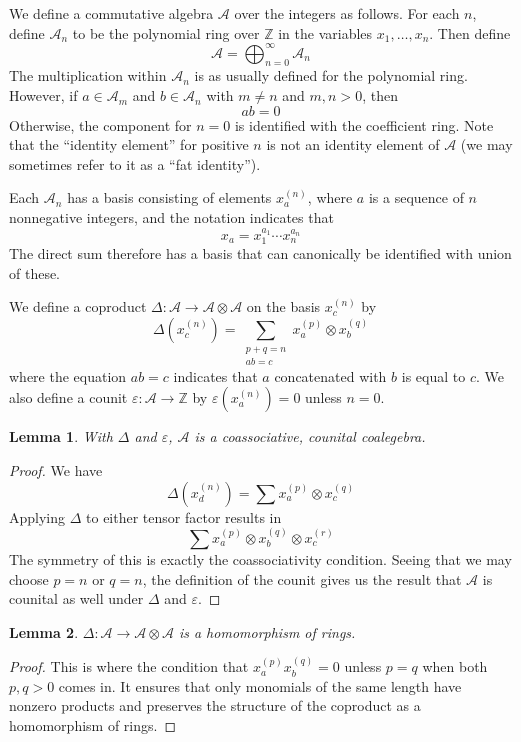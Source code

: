 \documentclass{amsart}
\newtheorem{lemma}{Lemma}[subsection]
\theoremstyle{definition}
\theoremstyle{remark}
\numberwithin{equation}{subsection}
\newcommand{\coma}{\mathcal{A}}
\begin{document}
We define a commutative algebra $\coma$ over the integers as follows. For each $n$, define $\coma_n$ to be the polynomial ring over $\mathbb{Z}$ in the variables $x_1,\ldots,x_n$. Then define
$$\coma =\bigoplus_{n=0}^\infty \coma_n$$
The multiplication within $\coma_n$ is as usually defined for the polynomial ring. However, if $a\in \coma_m$ and $b\in \coma_n$ with $m\neq n$ and $m,n>0$,  then
$$ab = 0$$
Otherwise, the component for $n=0$ is identified with the coefficient ring. Note that the ``identity element'' for positive $n$ is not an identity element of $\coma$ (we may sometimes refer to it as a ``fat identity'').

Each $\coma_n$ has a basis consisting of elements $x_a^{(n)}$, where $a$ is a sequence of $n$ nonnegative integers, and the notation indicates that
$$x_a = x_1^{a_1}\cdots x_n^{a_n}$$
The direct sum therefore has a basis that can canonically be identified with union of these.

We define a coproduct $\Delta:\coma\to\coma\otimes\coma$ on the basis $x_c^{(n)}$ by
$$\Delta(x_c^{(n)}) = \sum_{\substack{p+q=n\\ab=c}} x_a^{(p)}\otimes x_b^{(q)}$$
where the equation $ab=c$ indicates that $a$ concatenated with $b$ is equal to $c$. We also define a counit $\varepsilon:\coma\to \mathbb{Z}$ by $\varepsilon(x_a^{(n)})=0$ unless $n=0$.

\begin{lemma}
	With $\Delta$ and $\varepsilon$, $\coma$ is a coassociative, counital coalegebra.
\end{lemma}
\begin{proof}
	We have 
	$$\Delta(x_d^{(n)})=\sum x_a^{(p)}\otimes x_c^{(q)}$$
	Applying $\Delta$ to either tensor factor results in
	$$\sum x_a^{(p)}\otimes x_b^{(q)}\otimes x_c^{(r)}$$
	The symmetry of this is exactly the coassociativity condition. Seeing that we may choose $p=n$ or $q=n$, the definition of the counit gives us the result that $\coma$ is counital as well under $\Delta$ and $\varepsilon$.
\end{proof}

\begin{lemma}
	$\Delta:\coma\to\coma\otimes\coma$ is a homomorphism of rings.
\end{lemma}
\begin{proof}
	This is where the condition that $x_a^{(p)}x_b^{(q)}=0$ unless $p=q$ when both $p,q>0$ comes in. It ensures that only monomials of the same length have nonzero products and preserves the structure of the coproduct as a homomorphism of rings.
\end{proof}
\end{document}
